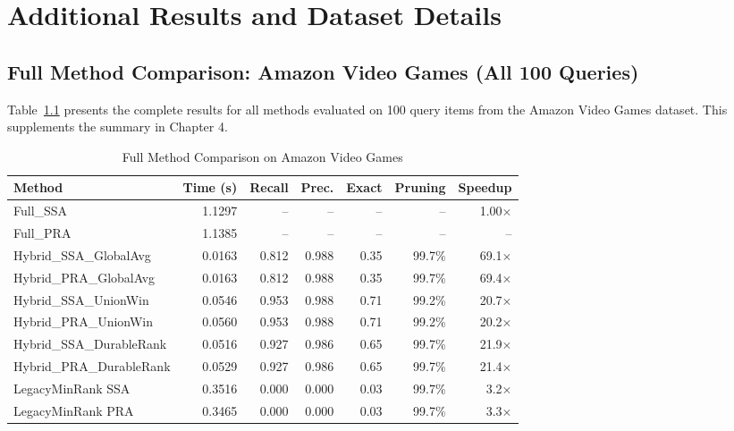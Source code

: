\chapter{Additional Results and Dataset Details}
\label{appendix:results}

\section{Full Method Comparison: Amazon Video Games (All 100 Queries)}

Table~\ref{tab:amazon_full} presents the complete results for all methods evaluated on 100 query items from the Amazon Video Games dataset. This supplements the summary in Chapter 4.

\begin{table}[htbp]
\centering
\caption{Full Method Comparison on Amazon Video Games}
\label{tab:amazon_full}
\footnotesize
\begin{tabular}{lrrrrrr}
\toprule
\textbf{Method} & \textbf{Time (s)} & \textbf{Recall} & \textbf{Prec.} & \textbf{Exact} & \textbf{Pruning} & \textbf{Speedup} \\
\midrule
Full\_SSA                  & 1.1297 & --    & --    & --   & --     & 1.00$\times$ \\
Full\_PRA                  & 1.1385 & --    & --    & --   & --     & -- \\
Hybrid\_SSA\_GlobalAvg     & 0.0163 & 0.812 & 0.988 & 0.35 & 99.7\% & 69.1$\times$ \\
Hybrid\_PRA\_GlobalAvg     & 0.0163 & 0.812 & 0.988 & 0.35 & 99.7\% & 69.4$\times$ \\
Hybrid\_SSA\_UnionWin      & 0.0546 & 0.953 & 0.988 & 0.71 & 99.2\% & 20.7$\times$ \\
Hybrid\_PRA\_UnionWin      & 0.0560 & 0.953 & 0.988 & 0.71 & 99.2\% & 20.2$\times$ \\
Hybrid\_SSA\_DurableRank   & 0.0516 & 0.927 & 0.986 & 0.65 & 99.7\% & 21.9$\times$ \\
Hybrid\_PRA\_DurableRank   & 0.0529 & 0.927 & 0.986 & 0.65 & 99.7\% & 21.4$\times$ \\
LegacyMinRank SSA          & 0.3516 & 0.000 & 0.000 & 0.03 & 99.7\% & 3.2$\times$ \\
LegacyMinRank PRA          & 0.3465 & 0.000 & 0.000 & 0.03 & 99.7\% & 3.3$\times$ \\
\bottomrule
\end{tabular}
\end{table}

